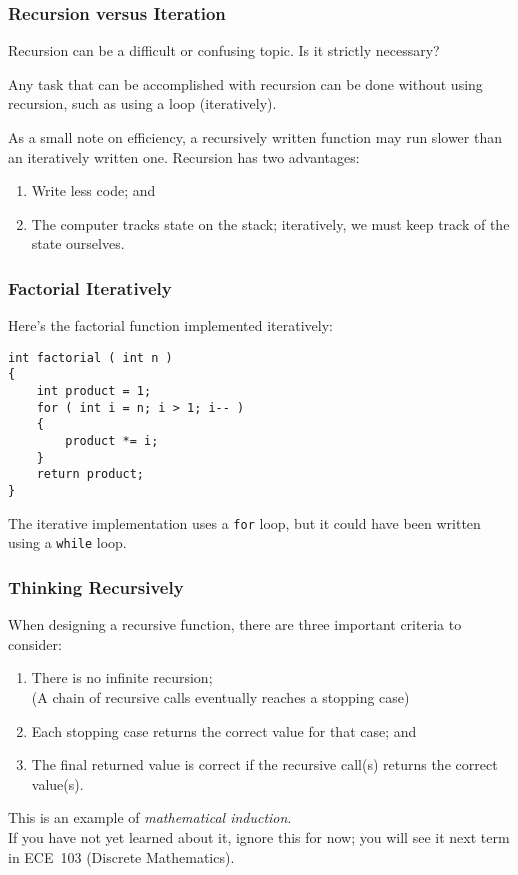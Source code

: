 \begin{frame}
\frametitle{Recursion versus Iteration}

Recursion can be a difficult or confusing topic. Is it strictly necessary?

Any task that can be accomplished with recursion can be done without using recursion, such as using a loop (iteratively).

As a small note on efficiency, a recursively written function may run slower than an iteratively written one. Recursion has two advantages:

\begin{enumerate}
	\item Write less code; and \\
	\item The computer tracks state on the stack; iteratively, we must keep track of the state ourselves.
\end{enumerate}

\end{frame}

\begin{frame}[fragile]
\frametitle{Factorial Iteratively}
Here's the factorial function implemented iteratively:

\begin{verbatim}
int factorial ( int n )
{
    int product = 1;
    for ( int i = n; i > 1; i-- )
    {
        product *= i;
    }
    return product;
}
\end{verbatim}

The iterative implementation uses a \texttt{for} loop, but it could have been written using a \texttt{while} loop.

\end{frame}

\begin{frame}
\frametitle{Thinking Recursively}
When designing a recursive function, there are three important criteria to consider:

\begin{enumerate}
	\item There is no infinite recursion;\\
	\quad (A chain of recursive calls eventually reaches a stopping case)
	\item Each stopping case returns the correct value for that case; and
	\item The final returned value is correct if the recursive call(s) returns the correct value(s).
\end{enumerate}

This is an example of \textit{mathematical induction}.\\
If you have not yet learned about it, ignore this for now; you will see it next term in ECE~103 (Discrete Mathematics).

\end{frame}

